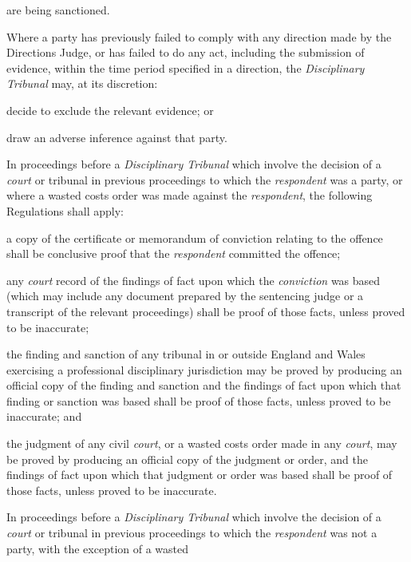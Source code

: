are being sanctioned.\\
\par
Where a party has previously failed to comply with any direction made by
the Directions Judge, or has failed to do any act, including the
submission of evidence, within the time period specified in a direction,
the \emph{Disciplinary Tribunal} may, at its discretion:\\\nl \item decide to exclude the relevant evidence; or\item draw an adverse inference against that party.\ln
{}\par
{}
In proceedings before a \emph{Disciplinary Tribunal} which involve the
decision of a \emph{court }or tribunal in previous proceedings to which
the \emph{respondent} was a party, or where a wasted costs order was
made against the \emph{respondent}, the following Regulations shall
apply:\\\nl \item a copy of the certificate or memorandum of conviction relating to the
offence shall be conclusive proof that the \emph{respondent} committed
the offence;\item any \emph{court }record of the findings of fact upon which
the \emph{conviction} was based (which may include any document prepared
by the sentencing judge or a transcript of the relevant proceedings)
shall be proof of those facts, unless proved to be inaccurate;\item the finding and sanction of any tribunal in or outside England and
Wales exercising a professional disciplinary jurisdiction may be proved
by producing an official copy of the finding and sanction and the
findings of fact upon which that finding or sanction was based shall be
proof of those facts, unless proved to be inaccurate; and\item the judgment of any civil \emph{court}, or a wasted costs order made
in any \emph{court}, may be proved by producing an official copy of the
judgment or order, and the findings of fact upon which that judgment or
order was based shall be proof of those facts, unless proved to be
inaccurate.\ln
{}\par
In proceedings before a \emph{Disciplinary Tribunal} which involve the
decision of a \emph{court }or tribunal in previous proceedings to which
the \emph{respondent} was not a party, with the exception of a wasted

